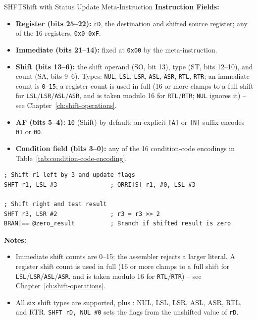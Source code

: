\begin{instructionbox}{SHFT}{Shift with Status Update Meta-Instruction}
	\textbf{Instruction Fields:}
	\begin{itemize}
		\item \textbf{Register (bits 25--22):} \texttt{rD}, the destination and shifted source register; any of the 16
		      registers, \texttt{0x0}--\texttt{0xF}.
		\item \textbf{Immediate (bits 21--14):} fixed at \texttt{0x00} by the meta-instruction.
		\item \textbf{Shift (bits 13--6):} the shift operand (SO, bit 13), type (ST, bits 12--10), and count (SA, bits 9--6). Types: \texttt{NUL}, \texttt{LSL}, \texttt{LSR}, \texttt{ASL}, \texttt{ASR},
		      \texttt{RTL}, \texttt{RTR}; an immediate count is \texttt{0}--\texttt{15}; a register count is used in
		      full (16 or more clamps to a full shift for \texttt{LSL}/\texttt{LSR}/\texttt{ASL}/\texttt{ASR}, and is
		      taken modulo 16 for \texttt{RTL}/\texttt{RTR}; \texttt{NUL} ignores it) -- see Chapter~\ref{ch:shift-operations}.
		\item \textbf{AF (bits 5--4):} \texttt{10} (Shift) by default; an explicit \texttt{[A]} or \texttt{[N]} suffix encodes \texttt{01} or \texttt{00}.
		\item \textbf{Condition field (bits 3--0):} any of the 16 condition-code encodings in
		      Table~\ref{tab:condition-code-encoding}.
	\end{itemize}

	\begin{example}
		\begin{lstlisting}
; Shift r1 left by 3 and update flags
SHFT r1, LSL #3               ; ORRI[S] r1, #0, LSL #3

; Shift right and test result
SHFT r3, LSR #2               ; r3 = r3 >> 2
BRAN|== @zero_result          ; Branch if shifted result is zero
		\end{lstlisting}
		\caption{Shifting and Testing with SHFT}
	\end{example}

	\textbf{Notes:}
	\begin{itemize}
		\item Immediate shift counts are 0--15; the assembler rejects a larger literal. A register shift count is used in full (16 or
		      more clamps to a full shift for \texttt{LSL}/\texttt{LSR}/\texttt{ASL}/\texttt{ASR}, and is taken modulo 16 for
		      \texttt{RTL}/\texttt{RTR}) -- see Chapter~\ref{ch:shift-operations}.
		\item All six shift types are supported, plus : NUL, LSL, LSR, ASL, ASR, RTL, and RTR. \texttt{SHFT rD, NUL
			      \#0} sets the flags from the unshifted value of \texttt{rD}.
	\end{itemize}
\end{instructionbox}


